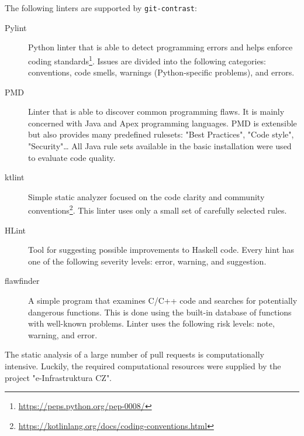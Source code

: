\documentclass[digital,oneside,oldtable,nolof,nolot,nocover]{fithesis4}
\begin{document}
The following linters are supported by \texttt{git-contrast}:
\begin{description}
\item[{Pylint}] Python linter that is able to detect programming errors and helps
enforce coding standards\footnote{\url{https://peps.python.org/pep-0008/}}.
Issues are divided into the following categories: conventions, code smells,
warnings (Python-specific problems), and errors.
\item[{PMD}] Linter that is able to discover common programming flaws. It is mainly
concerned with Java and Apex programming languages. PMD is extensible but also
provides many predefined rulesets: "Best Practices", "Code style", "Security"\dots{}
All Java rule sets available in the basic installation were used to evaluate code quality.
\item[{ktlint}] Simple static analyzer focused on the code clarity and community
conventions\footnote{\url{https://kotlinlang.org/docs/coding-conventions.html}}.
This linter uses only a small set of carefully selected rules.
\item[{HLint}] Tool for suggesting possible improvements to Haskell code.
Every hint has one of the following severity levels: error, warning, and suggestion.
\item[{flawfinder}] A simple program that examines C/C++ code and searches for potentially
dangerous functions. This is done using the built-in database of functions with
well-known problems. Linter uses the following risk levels: note, warning, and error.
\end{description}

The static analysis of a large number of pull requests is computationally intensive.
Luckily, the required computational resources were supplied by the project "e-Infrastruktura CZ".
\FloatBarrier
\end{document}
